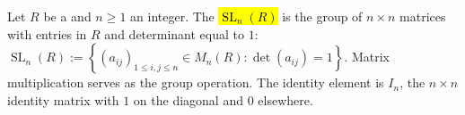\begin{definition} \label{definition:SL_n_of_a_ring}
Let $R$ be a  and $n \geq 1$ an integer. The  \hl{$\operatorname{SL}_n(R)$} is the group of $n \times n$ matrices with entries in $R$ and determinant equal to $1$:
$\operatorname{SL}_n(R) := \left\{ (a_{ij})_{1 \leq i,j \leq n} \in M_n(R) : \det(a_{ij}) = 1 \right\}$.
Matrix multiplication serves as the group operation. The identity element is $I_n$, the $n \times n$ identity matrix with $1$ on the diagonal and $0$ elsewhere.



\end{definition}
